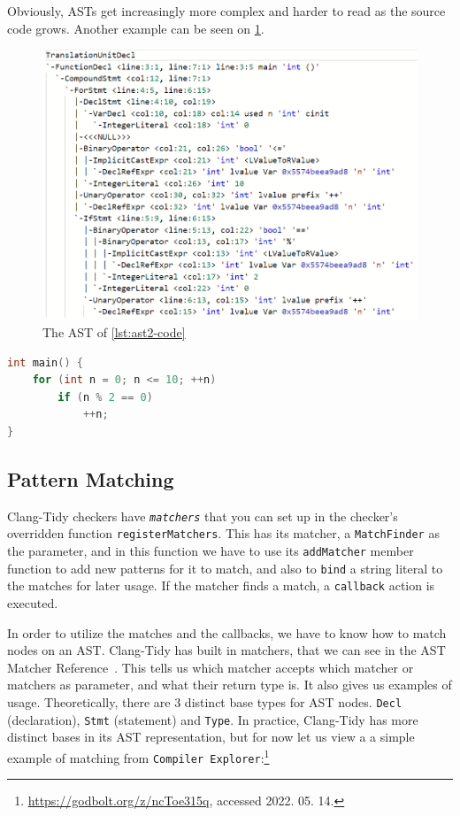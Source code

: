 Obviously, ASTs get increasingly more complex and harder to read as the source code grows. Another example can be seen on \cref{fig:ast2}.
\begin{figure}[H]
    \includegraphics[width=\linewidth]{images/random_ast2.png}
	\caption{The AST of \cref{lst:ast2-code}}
    \label{fig:ast2}
\end{figure}

\begin{lstlisting}[language={C++},caption={The code of \cref{fig:ast2}.},label={lst:ast2-code}]
int main() {
	for (int n = 0; n <= 10; ++n)
		if (n % 2 == 0)
			++n;
}
\end{lstlisting}

\subsection{Pattern Matching}

Clang-Tidy checkers have \emph{\texttt{matchers}} that you can set up in the checker's overridden function \texttt{registerMatchers}.
This has its matcher, a \texttt{MatchFinder} as the parameter, and in this function we have to use its \texttt{addMatcher}
member function to add new patterns for it to match, and also to \texttt{bind} a string literal to the matches for later usage.
If the matcher finds a match, a \texttt{callback} action is executed.

In order to utilize the matches and the callbacks, we have to know how to match nodes on an AST. Clang-Tidy has built in matchers,
that we can see in the AST Matcher Reference~\cite{matcherref}. This tells us which matcher accepts which matcher or matchers as
parameter, and what their return type is. It also gives us examples of usage.
Theoretically, there are 3 distinct base types for AST nodes. \texttt{Decl} (declaration), \texttt{Stmt} (statement) and \texttt{Type}. In practice,
Clang-Tidy has more distinct bases in its AST representation, but for now let us view a a simple example of matching from
\texttt{Compiler Explorer}:\footnote{\url{https://godbolt.org/z/ncToe315q}, accessed 2022. 05. 14.}

